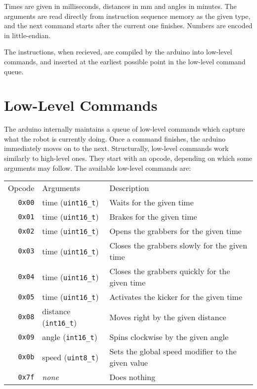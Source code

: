 \documentclass[a4paper]{scrartcl}
\begin{document}
Times are given in milliseconds, distances in mm and angles in minutes.  The
arguments are read directly from instruction sequence memory as the given type,
and the next command starts after the current one finishes. Numbers are encoded
in little-endian.

The instructions, when recieved, are compiled by the arduino into low-level
commands, and inserted at the earliest possible point in the low-level command
queue.

\section{Low-Level Commands}

The arduino internally maintains a queue of low-level commands which capture
what the robot is currently doing. Once a command finishes, the arduino
immediately moves on to the next. Structurally, low-level commands work
similarly to high-level ones. They start with an opcode, depending on which
some arguments may follow. The available low-level commands are:

\begin{tabularx}{\textwidth}{rlX}
    Opcode & Arguments & Description \\
    \texttt{0x00} & time (\verb$uint16_t$) &
        Waits for the given time \\
    \texttt{0x01} & time (\verb$uint16_t$) &
        Brakes for the given time \\
    \texttt{0x02} & time (\verb$uint16_t$) &
        Opens the grabbers for the given time \\
    \texttt{0x03} & time (\verb$uint16_t$) &
        Closes the grabbers slowly for the given time \\
    \texttt{0x04} & time (\verb$uint16_t$) &
        Closes the grabbers quickly for the given time \\
    \texttt{0x05} & time (\verb$uint16_t$) &
        Activates the kicker for the given time \\
    \texttt{0x08} & distance (\verb$int16_t$) &
        Moves right by the given distance \\
    \texttt{0x09} & angle (\verb$int16_t$) &
        Spins clockwise by the given angle \\
    \texttt{0x0b} & speed (\verb$uint8_t$) &
        Sets the global speed modifier to the given value \\
    \texttt{0x7f} & \textit{none} & Does nothing \\
\end{tabularx}
\end{document}
